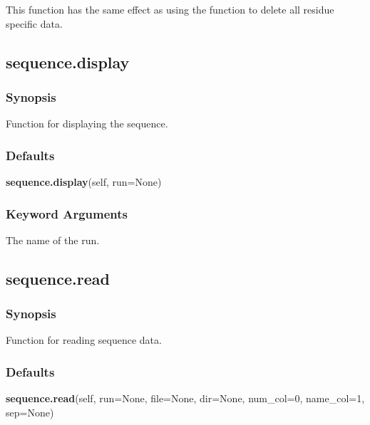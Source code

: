  This function has the same effect as using the  function to delete all residue specific data. 
  

  

 \newpage 

 \subsection{sequence.display} 

  
 \subsubsection{Synopsis} 

 Function for displaying the sequence. 
  

  
 \subsubsection{Defaults} 

 \textsf{\textbf{sequence.display}(self, run=None)} 

  
 \subsubsection{Keyword Arguments} 

   The name of the run.  

  

  

 \newpage 

 \subsection{sequence.read} 

  
 \subsubsection{Synopsis} 

 Function for reading sequence data. 
  

  
 \subsubsection{Defaults} 

 \textsf{\textbf{sequence.read}(self, run=None, file=None, dir=None, num\_col=0, name\_col=1, sep=None)} 

